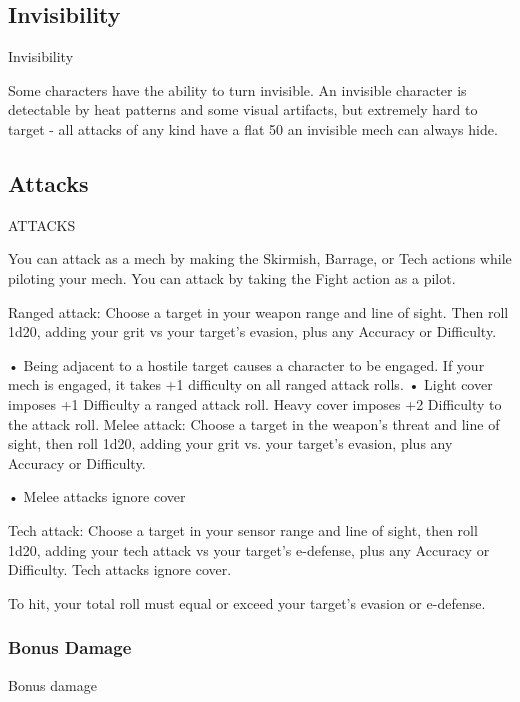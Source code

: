 \subsection{Invisibility}

                                                 Invisibility

Some characters have the ability to turn invisible. An invisible character is detectable by heat
patterns and some visual artifacts, but extremely hard to target - all attacks of any kind have a
flat 50%
an invisible mech can always hide.

\subsection{Attacks}
                                                  ATTACKS

You can attack as a mech by making the Skirmish, Barrage, or Tech actions while piloting your
mech. You can attack by taking the Fight action as a pilot.

Ranged attack: Choose a target in your weapon range and line of sight. Then roll 1d20, adding
your grit vs your target’s evasion, plus any Accuracy or Difficulty.

                      •  Being adjacent to a hostile target causes a character to be engaged. If your
                        mech is engaged, it takes +1 difficulty on all ranged attack rolls.
                      •  Light cover imposes +1 Difficulty a ranged attack roll. Heavy cover imposes
                        +2 Difficulty to the attack roll.
Melee attack: Choose a target in the weapon’s threat and line of sight, then roll 1d20, adding
your grit vs. your target’s evasion, plus any Accuracy or Difficulty.

                      •  Melee attacks ignore cover

Tech attack: Choose a target in your sensor range and line of sight, then roll 1d20, adding your
tech attack vs your target’s e-defense, plus any Accuracy or Difficulty. Tech attacks ignore
cover.


To hit, your total roll must equal or exceed your target’s evasion or e-defense.

\subsubsection{Bonus Damage}
                                             Bonus damage

